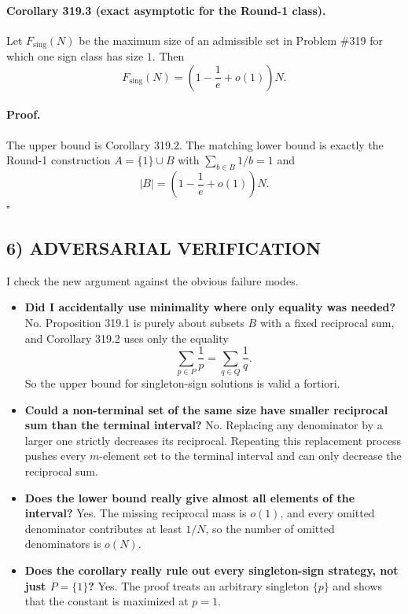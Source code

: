 \paragraph{Corollary 319.3 (exact asymptotic for the Round-1 class).}
Let $F_{\mathrm{sing}}(N)$ be the maximum size of an admissible set in Problem \#319 for which one sign class has size $1$.  Then
\[
F_{\mathrm{sing}}(N)=\left(1-\frac1e+o(1)\right)N.
\]

\paragraph{Proof.}
The upper bound is Corollary 319.2.  The matching lower bound is exactly the Round-1 construction $A=\{1\}\cup B$ with $\sum_{b\in B}1/b=1$ and
\[
|B|=\left(1-\frac1e+o(1)\right)N.
\]
\hfill $\square$

\subsection*{6) ADVERSARIAL VERIFICATION}
I check the new argument against the obvious failure modes.

\begin{itemize}
\item \textbf{Did I accidentally use minimality where only equality was needed?}  
No.  Proposition 319.1 is purely about subsets $B$ with a fixed reciprocal sum, and Corollary 319.2 uses only the equality
\[
\sum_{p\in P}\frac1p=\sum_{q\in Q}\frac1q.
\]
So the upper bound for singleton-sign solutions is valid a fortiori.

\item \textbf{Could a non-terminal set of the same size have smaller reciprocal sum than the terminal interval?}  
No.  Replacing any denominator by a larger one strictly decreases its reciprocal.  Repeating this replacement process pushes every $m$-element set to the terminal interval and can only decrease the reciprocal sum.

\item \textbf{Does the lower bound really give almost all elements of the interval?}  
Yes.  The missing reciprocal mass is $o(1)$, and every omitted denominator contributes at least $1/N$, so the number of omitted denominators is $o(N)$.

\item \textbf{Does the corollary really rule out every singleton-sign strategy, not just $P=\{1\}$?}  
Yes.  The proof treats an arbitrary singleton $\{p\}$ and shows that the constant is maximized at $p=1$.
\end{itemize}

